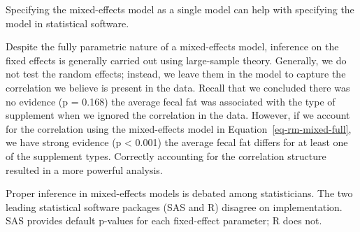 \documentclass[
  letterpaper,
  DIV=11,
  numbers=noendperiod]{scrreprt}
\theoremstyle{definition}
\theoremstyle{definition}
\theoremstyle{remark}
\begin{document}
\begin{tcolorbox}[enhanced jigsaw, left=2mm, toprule=.15mm, arc=.35mm, breakable, opacitybacktitle=0.6, opacityback=0, rightrule=.15mm, colbacktitle=quarto-callout-note-color!10!white, coltitle=black, leftrule=.75mm, toptitle=1mm, colframe=quarto-callout-note-color-frame, titlerule=0mm, title=\textcolor{quarto-callout-note-color}{\faInfo}\hspace{0.5em}{Note}, bottomrule=.15mm, colback=white, bottomtitle=1mm]

Specifying the mixed-effects model as a single model can help with
specifying the model in statistical software.

\end{tcolorbox}

Despite the fully parametric nature of a mixed-effects model, inference
on the fixed effects is generally carried out using large-sample theory.
Generally, we do not test the random effects; instead, we leave them in
the model to capture the correlation we believe is present in the data.
Recall that we concluded there was no evidence (p = 0.168) the average
fecal fat was associated with the type of supplement when we ignored the
correlation in the data. However, if we account for the correlation
using the mixed-effects model in Equation~\ref{eq-rm-mixed-full}, we
have strong evidence (p \textless{} 0.001) the average fecal fat differs
for at least one of the supplement types. Correctly accounting for the
correlation structure resulted in a more powerful analysis.

\begin{tcolorbox}[enhanced jigsaw, left=2mm, toprule=.15mm, arc=.35mm, breakable, opacitybacktitle=0.6, opacityback=0, rightrule=.15mm, colbacktitle=quarto-callout-warning-color!10!white, coltitle=black, leftrule=.75mm, toptitle=1mm, colframe=quarto-callout-warning-color-frame, titlerule=0mm, title=\textcolor{quarto-callout-warning-color}{\faExclamationTriangle}\hspace{0.5em}{Warning}, bottomrule=.15mm, colback=white, bottomtitle=1mm]

Proper inference in mixed-effects models is debated among statisticians.
The two leading statistical software packages (SAS and R) disagree on
implementation. SAS provides default p-values for each fixed-effect
parameter; R does not.

\end{tcolorbox}
\end{document}
